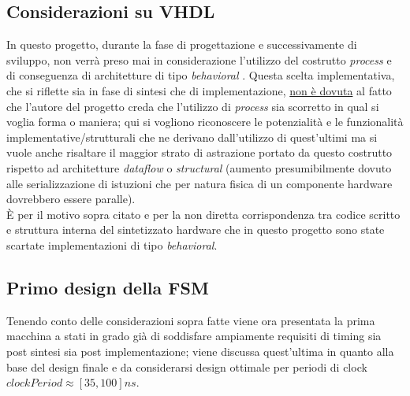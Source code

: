 \documentclass[11pt,a4paper]{article}
\begin{document}
        \subsection{Considerazioni su VHDL}
            In questo progetto, durante la fase di progettazione e successivamente di sviluppo, non verrà preso mai in considerazione l'utilizzo del costrutto \textit{process} e di conseguenza
             di architetture di tipo \textit{behavioral} . Questa scelta implementativa, che si riflette sia in fase di sintesi che di implementazione, \underline{non è dovuta} al fatto che l'autore 
             del progetto creda che l'utilizzo di \textit{process} sia scorretto in qual si voglia forma o maniera; qui si vogliono riconoscere le potenzialità e le funzionalità implementative/strutturali 
             che ne derivano dall'utilizzo di quest'ultimi ma si vuole anche risaltare il maggior strato di astrazione portato da questo costrutto rispetto ad architetture \textit{dataflow} o \textit{structural} (aumento presumibilmente
             dovuto alle serializzazione di istuzioni che per natura fisica di un componente hardware dovrebbero essere paralle).\\
            È per il motivo sopra citato e per la non diretta corrispondenza tra codice scritto e struttura interna del sintetizzato hardware che in questo progetto sono state scartate implementazioni di tipo \textit{behavioral}.
        \subsection{Primo design della FSM}
            Tenendo conto delle considerazioni sopra fatte viene ora presentata la prima macchina a stati in grado già di soddisfare ampiamente requisiti di timing sia post sintesi sia post implementazione; viene discussa quest'ultima in 
            quanto alla base del design finale e da considerarsi design ottimale per periodi di clock $clockPeriod \approx [35,100] ns$.
            \newpage
\end{document}
